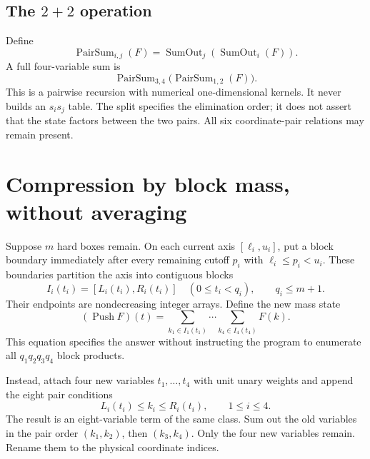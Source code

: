 \documentclass[12pt,a4paper]{article}
\theoremstyle{remark}
\newcommand{\1}{\mathbf1}
\newcommand{\PairSum}{\operatorname{PairSum}}
\newcommand{\SumOut}{\operatorname{SumOut}}
\newcommand{\Push}{\operatorname{Push}}
\begin{document}
\subsection{The $2+2$ operation}
Define
\[
 \PairSum_{i,j}(F)=\SumOut_j(\SumOut_i(F)).
\]
A full four-variable sum is
\[
               \PairSum_{3,4}\bigl(\PairSum_{1,2}(F)\bigr).
\]
This is a pairwise recursion with numerical one-dimensional kernels. It
never builds an $s_i s_j$ table. The split specifies the elimination order;
it does not assert that the state factors between the two pairs. All six
coordinate-pair relations may remain present.

\section{Compression by block mass, without averaging}\label{sec:push}
Suppose $m$ hard boxes remain. On each current axis $[\ell_i,u_i]$, put
a block boundary immediately after every remaining cutoff $p_i$ with
$\ell_i\le p_i<u_i$. These boundaries partition the axis into contiguous
blocks
\[
          I_i(t_i)=[L_i(t_i),R_i(t_i)]\quad
          (0\le t_i<q_i),\qquad q_i\le m+1.
\]
Their endpoints are nondecreasing integer arrays. Define the new mass state
\begin{equation}
 (\Push F)(t)=
 \sum_{k_1\in I_1(t_1)}\cdots\sum_{k_4\in I_4(t_4)}F(k).
                                                        \label{eq:push}
\end{equation}
This equation specifies the answer without instructing the program to
enumerate all $q_1q_2q_3q_4$ block products.

Instead, attach four new variables $t_1,\ldots,t_4$ with unit unary weights
and append the eight pair conditions
\[
              L_i(t_i)\le k_i\le R_i(t_i),\qquad 1\le i\le4.
\]
The result is an eight-variable term of the same class. Sum out the old
variables in the pair order $(k_1,k_2)$, then $(k_3,k_4)$. Only the four
new variables remain. Rename them to the physical coordinate indices.

\begin{center}
\end{center}
\end{document}

